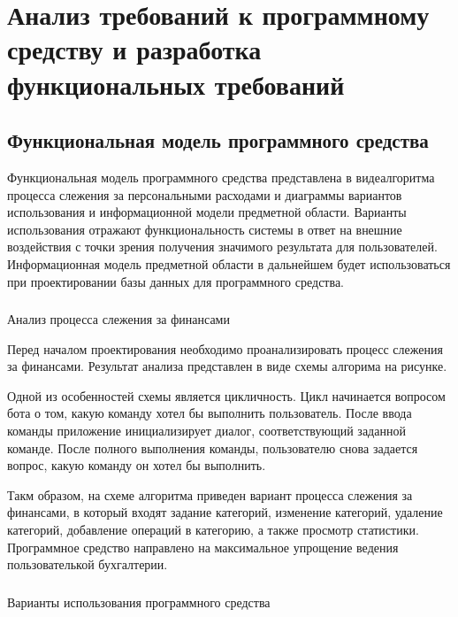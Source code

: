 \section{Анализ требований к программному средству и разработка функциональных требований}
\label{sec:domain}

\subsection{Функциональная модель программного средства}
\label{sec:domain:model}

Функциональная модель программного средства представлена в виде алгоритма процесса слежения за персональными расходами и диаграммы вариантов использования и информационной модели предметной области. Варианты использования отражают функциональность системы в ответ на внешние воздействия с точки зрения получения значимого результата для пользователей. Информационная модель предметной области в дальнейшем будет использоваться при проектировании базы данных для программного средства.

\subsubsection{} Анализ процесса слежения за финансами
\label{sec:domain:model:deeds}

Перед началом проектирования необходимо проанализировать процесс слежения за финансами. Результат анализа представлен в виде схемы алгорима на рисунке.

Одной из особенностей схемы является цикличность. Цикл начинается вопросом бота о том, какую команду хотел бы выполнить пользователь. После ввода команды приложение инициализирует диалог, соответствующий заданной команде. После полного выполнения команды, пользователю снова задается вопрос, какую команду он хотел бы выполнить.

Такм образом, на схеме алгоритма приведен вариант процесса слежения за финансами, в который входят задание категорий, изменение категорий, удаление категорий, добавление операций в категорию, а также просмотр статистики. Программное средство направлено на максимальное упрощение ведения пользователькой бухгалтерии.

\subsubsection{} Варианты использования программного средства
\label{sec:domain:model:use_cases}

